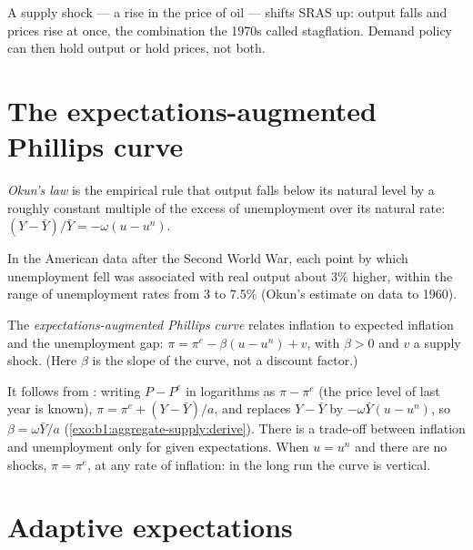A supply shock --- a rise in the price of oil --- shifts SRAS up: output
falls and prices rise at once, the combination the 1970s called
stagflation. Demand policy can then hold output or hold prices, not both.

\section{The expectations-augmented Phillips curve}\label{sec:b1:aggregate-supply:phillips}

\begin{definition}\label{def:b1:aggregate-supply:okun}
\emph{Okun's law} is the empirical rule that output falls below its natural
level by a roughly constant multiple of the excess of unemployment over its
natural rate: $(Y - \bar Y)/\bar Y = -\omega(u - u^n)$.
\end{definition}

In the American data after the Second World War, each point by which
unemployment fell was associated with real output about $3\%$ higher, within
the range of unemployment rates from 3 to 7.5\% (Okun's estimate on data to
1960). %

\begin{definition}\label{def:b1:aggregate-supply:phillips}
The \emph{expectations-augmented Phillips curve} relates inflation to
expected inflation and the unemployment gap: $\pi = \pi^e - \beta(u - u^n) + v$, with $\beta > 0$
and $v$ a supply shock. (Here $\beta$ is the slope of the curve, not a discount
factor.)
\end{definition}

It follows from : writing $P - P^e$ in logarithms as $\pi - \pi^e$ (the
price level of last year is known), $\pi = \pi^e + (Y - \bar Y)/a$, and 
replaces $Y - \bar Y$ by $-\omega\bar Y(u - u^n)$, so $\beta = \omega\bar Y/a$ (\cref{exo:b1:aggregate-supply:derive}).
There is a trade-off between inflation and unemployment only for given
expectations. When $u = u^n$ and there are no shocks, $\pi = \pi^e$, at any rate of
inflation: in the long run the curve is vertical.

\section{Adaptive expectations}\label{sec:b1:aggregate-supply:adaptive}

